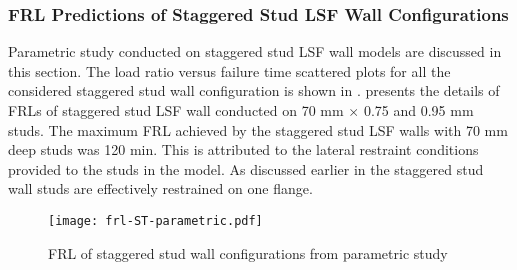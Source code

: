 \subsubsection{FRL Predictions of Staggered Stud LSF Wall Configurations}

Parametric study conducted on staggered stud LSF wall models are discussed in this section. The load ratio versus failure time scattered plots for all the considered staggered stud wall configuration is shown in .  presents the details of FRLs of staggered stud LSF wall conducted on 70 mm $\times$ 0.75 and 0.95 mm studs. The maximum FRL achieved by the staggered stud LSF walls with 70 mm deep studs was 120 min. This is attributed to the lateral restraint conditions provided to the studs in the model. As discussed earlier in  the staggered stud wall studs are effectively restrained on one flange. 
\begin{figure}[!htbp]
	\centering
	\texttt{[image: frl-ST-parametric.pdf]}
	\caption{FRL of staggered stud wall configurations from parametric study}
	\label{fig:frl-ST-parametric}
\end{figure}
